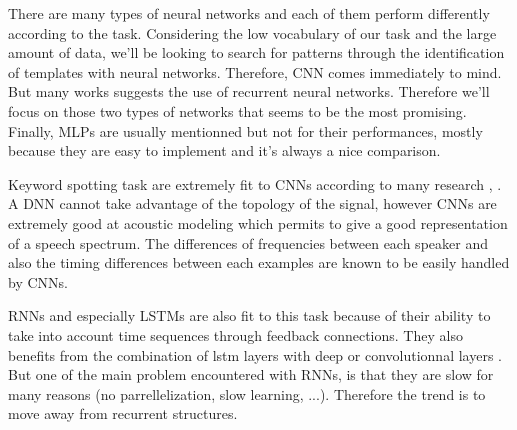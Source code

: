 There are many types of neural networks and each of them perform differently according to the task. Considering the low vocabulary of our task and the large amount of data, we'll be looking to search for patterns through the identification of templates with neural networks. Therefore, CNN comes immediately to mind. But many works suggests the use of recurrent neural networks. Therefore we'll focus on those two types of networks that seems to be the most promising. Finally, MLPs are usually mentionned but not for their performances, mostly because they are easy to implement and it's always a nice comparison.

\vspace{5mm}

Keyword spotting task are extremely fit to CNNs according to many research \cite{CNN}, \cite{init}. A DNN cannot take advantage of the topology of the signal, however CNNs are extremely good at acoustic modeling which permits to give a good representation of a speech spectrum. The differences of frequencies between each speaker and also the timing differences between each examples are known to be easily handled by CNNs.

\vspace{5mm}

RNNs and especially LSTMs are also fit to this task because of their ability to take into account time sequences through feedback connections. They also benefits from the combination of lstm layers with deep or convolutionnal layers \cite{graves}. But one of the main problem encountered with RNNs, is that they are slow for many reasons (no parrellelization, slow learning, ...). Therefore the trend is to move away from recurrent structures.




